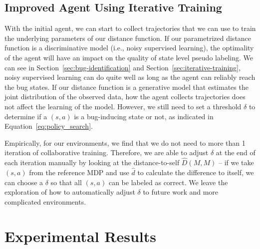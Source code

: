\documentclass{article}
\newcommand{\EDIT}[1]{#1}%
\begin{document}
\subsection{Improved Agent Using Iterative Training}
\label{sec:ct-alg}
\vspace{-2mm} 
\EDIT{With} the initial agent, we can start to collect trajectories that we can use to train the underlying parameters of our distance function. 
\EDIT{If our parametrized distance function is a discriminative model (i.e., noisy supervised learning), the optimality of the agent will have an impact on the quality of state level pseudo labeling. We can see in Section~\ref{sec:bug-identification} and Section~\ref{sec:iterative-training}, noisy supervised learning can do quite well as long as the agent can reliably reach the bug states. If our distance function is a generative model that estimates the joint distribution of the observed data, how the agent collects trajectories does not affect the learning of the model. However, we still need to set a threshold $\delta$ to determine}
if a $(s, a)$ is a bug-inducing state or not, \EDIT{as indicated in Equation~\ref{eq:policy_search}.}

Empirically, for our environments, \EDIT{we find that} we do not need to more than 1 iteration of collaborative training. Therefore, we are able to adjust $\delta$ at the end of each iteration manually by looking at the distance-to-self $\hat D(M, M)$ -- if we take $(s, a)$ from the reference MDP and use $\hat d$ to calculate the difference to itself, we can choose a $\delta$ so that all $(s, a)$ can be labeled as correct. We leave the exploration of how to automatically adjust $\delta$ to future work and more complicated environments.





\section{Experimental Results}
\vspace{-2mm} 
\end{document}
